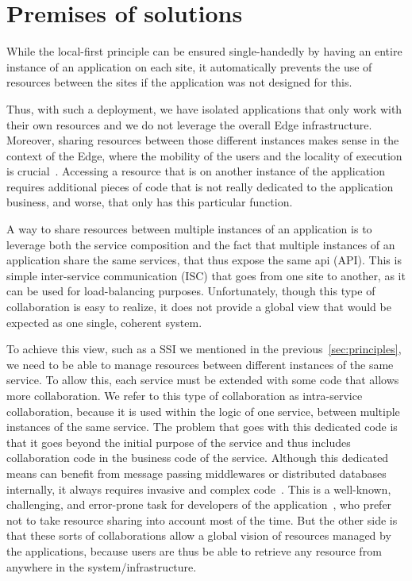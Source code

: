 \section{Premises of solutions} %
\label{sec:c-to-e-solutions}



While the local-first principle can be ensured single-handedly by
having an entire instance of an application on each site, it
automatically prevents the use of resources between the sites if the
application was not designed for this.
%

Thus, with such a deployment, we have isolated applications that only
work with their own resources and we do not leverage the overall Edge
infrastructure.
%
Moreover, sharing resources between those different instances makes
sense in the context of the Edge, where the mobility of the users and
the locality of execution is crucial~\cite{SCZKX16, CLPW+18}.
%
Accessing a resource that is on another instance of the application
requires additional pieces of code that is not really dedicated to the
application business, and worse, that only has this particular
function.
%

A way to share resources between multiple instances of an application
is to leverage both the service composition and the fact that multiple
instances of an application share the same services, that thus expose
the same \gls{api} (\acrshort{API}).
%
This is simple inter-service communication (ISC) that goes from one
site to another, as it can be used for load-balancing purposes.
%
Unfortunately, though this type of collaboration is easy to realize,
it does not provide a global view that would be expected as one
single, coherent system.

To achieve this view, such as a SSI we mentioned in the
previous~\autoref{sec:principles}, we need to be able to manage
resources between different instances of the same service.
%
To allow this, each service must be extended with some code that
allows more collaboration.
%
We refer to this type of collaboration as intra-service collaboration,
because it is used within the logic of one service, between multiple
instances of the same service.
%
The problem that goes with this dedicated code is that it goes beyond
the initial purpose of the service and thus includes collaboration
code in the business code of the service.
%
Although this dedicated means can benefit from message passing
middlewares or distributed databases internally, it always requires
invasive and complex code~\cite{CDLR+20}.
%
This is a well-known, challenging, and error-prone task for developers
of the application~\cite{ACHM11, BHJL+87, HR85}, who prefer not to
take resource sharing into account most of the time.
%
But the other side is that these sorts of collaborations allow a
global vision of resources managed by the applications, because
users are thus be able to retrieve any resource from anywhere in the
system/infrastructure.


